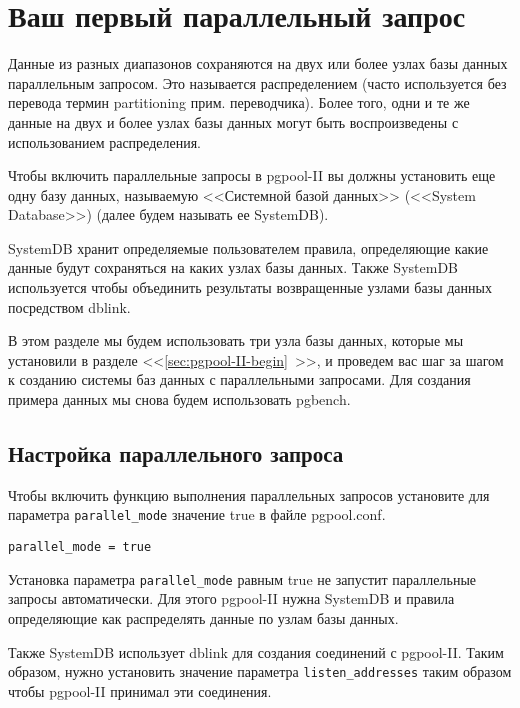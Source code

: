 \section{Ваш первый параллельный запрос}

Данные из разных диапазонов сохраняются на двух или более узлах базы данных параллельным запросом. Это называется распределением (часто используется без перевода термин partitioning прим. переводчика). Более того, одни и те же данные на двух и более узлах базы данных могут быть воспроизведены с использованием распределения.

Чтобы включить параллельные запросы в pgpool-II вы должны установить еще одну базу данных, называемую <<Системной базой данных>> (<<System Database>>) (далее будем называть ее SystemDB).

SystemDB хранит определяемые пользователем правила, определяющие какие данные будут сохраняться на каких узлах базы данных. Также SystemDB используется чтобы объединить результаты возвращенные узлами базы данных посредством dblink.

В этом разделе мы будем использовать три узла базы данных, которые мы установили в разделе <<\ref{sec:pgpool-II-begin}~>>, и проведем вас шаг за шагом к созданию системы баз данных с параллельными запросами. Для создания примера данных мы снова будем использовать pgbench.

\subsection{Настройка параллельного запроса}

Чтобы включить функцию выполнения параллельных запросов установите для параметра \lstinline!parallel_mode! значение true в файле pgpool.conf.

\begin{lstlisting}[label=lst:pgpool22,caption=Настройка параллельного запроса]
parallel_mode = true
\end{lstlisting}

Установка параметра \lstinline!parallel_mode! равным true не запустит параллельные запросы автоматически. Для этого pgpool-II нужна SystemDB и правила определяющие как распределять данные по узлам базы данных.

Также SystemDB использует dblink для создания соединений с pgpool-II. Таким образом, нужно установить значение параметра \lstinline!listen_addresses! таким образом чтобы pgpool-II принимал эти соединения.

